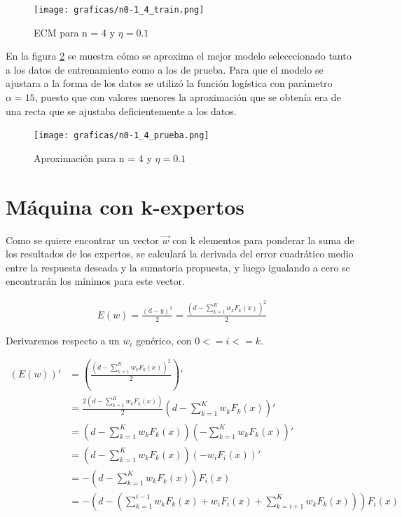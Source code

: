 \documentclass[a4paper]{article}
\begin{document}
	\begin{figure}[H]
	  \centering
	  \texttt{[image: graficas/n0-1\_4\_train.png]}
	  \caption{ECM para n = 4 y $\eta = 0.1$}
	  \label{fig:n0-1_4_train}
	\end{figure}

En la figura \ref{fig:n0-1_4_prueba} se muestra cómo se aproxima el mejor modelo selecccionado tanto a los datos de entrenamiento como a los de prueba. Para que el modelo se ajustara a la forma de los datos se utilizó la función logística con parámetro $\alpha = 15$, puesto que con valores menores la aproximación que se obtenía era de una recta que se ajustaba deficientemente a los datos.

	\begin{figure}[H]
	  \centering
	  \texttt{[image: graficas/n0-1\_4\_prueba.png]}
	  \caption{Aproximación para n = 4 y $\eta = 0.1$}
	  \label{fig:n0-1_4_prueba}
	\end{figure}

\section{Máquina con k-expertos}
Como se quiere encontrar un vector $\vec{w}$ con k elementos para ponderar la suma de los resultados de los expertos, se calculará la derivada del error cuadrático medio entre la respuesta deseada y la sumatoria propuesta, y luego igualando a cero se encontrarán los mínimos para este vector.

\begin{align*}
E(w) = \frac{(d - y)^{2}}{2} = \frac{(d - \sum_{k=1}^{K}w_{k}F_{k}(x) )^{2} }{2}
\end{align*}

Derivaremos respecto a un $w_{i}$ genérico, con $0 <= i <= k$.

\begin{align*}
(E(w))' &= (\frac{(d - \sum_{k=1}^{K}w_{k}F_{k}(x) )^{2} }{2})'\\
	    &= \frac{2(d - \sum_{k=1}^{K}w_{k}F_{k}(x) ) }{2}(d - \sum_{k=1}^{K}w_{k}F_{k}(x))'	 \\
	    &= (d - \sum_{k=1}^{K}w_{k}F_{k}(x) )(-\sum_{k=1}^{K}w_{k}F_{k}(x))' \\
	    &= (d - \sum_{k=1}^{K}w_{k}F_{k}(x) )(-w_{i}F_{i}(x))'  \\
	    &= -(d - \sum_{k=1}^{K}w_{k}F_{k}(x) )F_{i}(x)\\
	    &= -(d - (\sum_{k=1}^{i-1}w_{k}F_{k}(x) + w_{i}F_{i}(x) + \sum_{k=i+1}^{K}w_{k}F_{k}(x) ) )F_{i}(x)
\end{align*}
\end{document}
